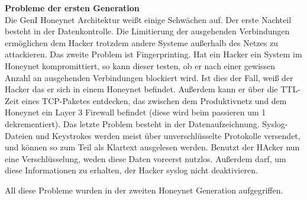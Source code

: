 \noindent\textbf{Probleme der ersten Generation}\\
\noindent Die GenI Honeynet Architektur weißt einige Schwächen auf. Der erste Nachteil besteht in der Datenkontrolle. Die Limitierung der ausgehenden Verbindungen ermöglichen dem Hacker trotzdem andere Systeme außerhalb des Netzes zu attackieren. Das zweite Problem ist Fingerprinting. Hat ein Hacker ein System im Honeynet kompromittiert, so kann dieser testen, ob er nach einer gewissen Anzahl an ausgehenden Verbindungen blockiert wird. Ist dies der Fall, weiß der Hacker das er sich in einem Honeynet befindet. Außerdem kann er über die TTL-Zeit eines TCP-Paketes entdecken, das zwischen dem Produktivnetz und dem Honeynet ein Layer 3 Firewall befindet (diese wird beim passieren um 1 dekrementiert). Das letzte Problem besteht in der Datenaufzeichnung. Syslog-Dateien und Keystrokes werden meist über unverschlüsselte Protokolle versendet, und können so zum Teil als Klartext ausgelesen werden. Benutzt der HAcker nun eine Verschlüsselung, weden diese Daten voreerst nutzlos. Außerdem darf, um diese Informationen zu erhalten, der Hacker syslog nicht deaktivieren\cite{spitzner.2002a}.

All diese Probleme wurden in der zweiten Honeynet Generation aufgegriffen.